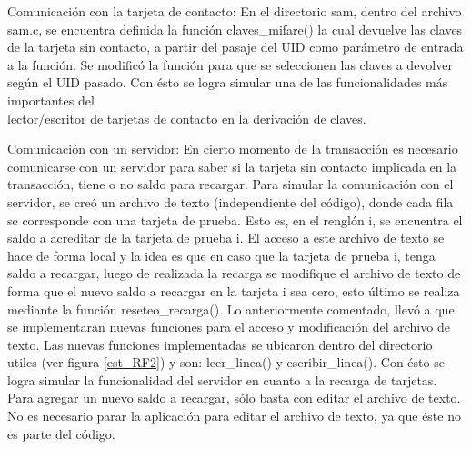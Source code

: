 \newpage
{}

\bigskip
Comunicación con la tarjeta de contacto: En el directorio sam, dentro del archivo sam.c, se encuentra definida la función claves\_mifare() la cual devuelve las claves de la tarjeta sin contacto, a partir del pasaje del UID como parámetro de entrada a la función. Se modificó la función para que se seleccionen las claves a devolver según el UID pasado. Con ésto se logra simular una de las funcionalidades más importantes del \\
lector/escritor de tarjetas de contacto en la derivación de claves.

\bigskip
Comunicación con un servidor: En cierto momento de la transacción es necesario comunicarse con un servidor para saber si la tarjeta sin contacto implicada en la transacción, tiene o no saldo para recargar. Para simular la comunicación con el servidor, se creó un archivo de texto (independiente del código), donde cada fila se corresponde con una tarjeta de prueba. Esto es, en el renglón i, se encuentra el saldo a acreditar de la tarjeta de prueba i. El acceso a este archivo de texto se hace de forma local y la idea es que en caso que la tarjeta de prueba i, tenga saldo a recargar, luego de realizada la recarga se modifique el archivo de texto de forma que el nuevo saldo a recargar en la tarjeta i sea cero, esto último se realiza mediante la función reseteo\_recarga(). Lo anteriormente comentado, llevó a que se implementaran nuevas funciones para el acceso y modificación del archivo de texto. Las nuevas funciones implementadas se ubicaron dentro del directorio utiles (ver figura \ref{est_RF2}) y son: leer\_linea() y escribir\_linea(). Con ésto se logra simular la funcionalidad del servidor en cuanto a la recarga de tarjetas. Para agregar un nuevo saldo a recargar, sólo basta con editar el archivo de texto. No es necesario parar la aplicación para editar el archivo de texto, ya que éste no es parte del código.

